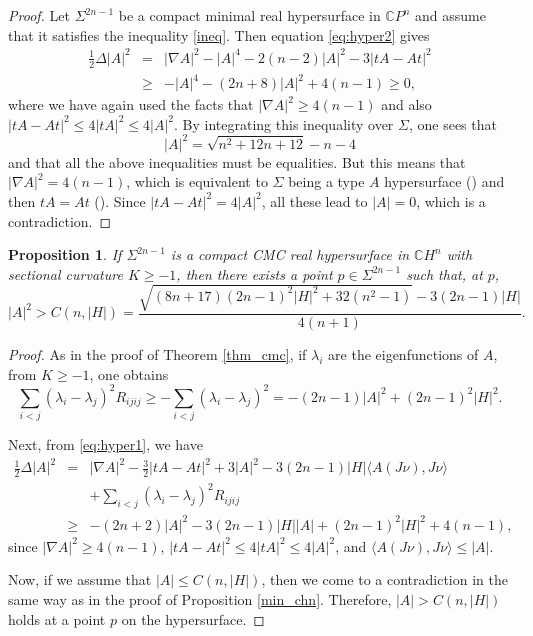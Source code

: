 \documentclass[11pt]{amsart}
\theoremstyle{plain}
\newtheorem{proposition}  [theorem]  {Proposition}
\theoremstyle{definition}
\numberwithin{equation}{section}
\begin{document}
\begin{proof} Let $\Sigma^{2n-1}$ be a compact minimal real hypersurface in $\mathbb{C}P^n$ and assume that it satisfies the inequality \eqref{ineq}. Then equation \eqref{eq:hyper2} gives
\begin{eqnarray*}
\frac{1}{2}\Delta |A|^2&=&|\nabla A|^2-|A|^4-2(n-2)|A|^2-3|tA-At|^2\\&\geq&-|A|^4-(2n+8)|A|^2+4(n-1)\geq 0,
\end{eqnarray*}
where we have again used the facts that $|\nabla A|^2\geq 4(n-1)$ and also $|tA-At|^2\leq 4|tA|^2\leq 4|A|^2$. By integrating this inequality over $\Sigma$, one sees that
$$
|A|^2=\sqrt{n^2+12n+12}-n-4
$$
and that all the above inequalities must be equalities. But this means that $|\nabla A|^2=4(n-1)$, which is equivalent to $\Sigma$ being a type $A$ hypersurface (\cite[Corollary 4.4]{NR}) and then $tA=At$ (\cite[Theorem 4.1]{NR}). Since $|tA-At|^2=4|A|^2$, all these lead to $|A|=0$, which is a contradiction.
\end{proof}

\begin{proposition} If $\Sigma^{2n-1}$ is a compact CMC real hypersurface in $\mathbb{C}H^n$ with sectional curvature $K\geq -1$, then there exists a point $p\in\Sigma^{2n-1}$ such that, at $p$,
$$
|A|^2>C(n,|H|)=\frac{\sqrt{(8n+17)(2n-1)^2|H|^2+32(n^2-1)}-3(2n-1)|H|}{4(n+1)}.
$$
\end{proposition}

\begin{proof} As in the proof of Theorem \ref{thm_cmc}, if $\lambda_i$ are the eigenfunctions of $A$, from $K\geq -1$, one obtains
$$
\sum_{i<j}(\lambda_i-\lambda_j)^2R_{ijij}\geq-\sum_{i<j}(\lambda_i-\lambda_j)^2=-(2n-1)|A|^2+(2n-1)^2|H|^2.
$$

Next, from \eqref{eq:hyper1}, we have
\begin{eqnarray*}
\frac{1}{2}\Delta|A|^2&=&|\nabla A|^2-\frac{3}{2}|tA-At|^2+3|A|^2-3(2n-1)|H|\langle A(J\nu),J\nu\rangle\\&&+\sum_{i<j}(\lambda_i-\lambda_j)^2R_{ijij}\\&\geq&-(2n+2)|A|^2-3(2n-1)|H||A|+(2n-1)^2|H|^2+4(n-1),
\end{eqnarray*}
since $|\nabla A|^2\geq 4(n-1)$, $|tA-At|^2\leq 4|tA|^2\leq 4|A|^2$, and $\langle A(J\nu),J\nu\rangle\leq |A|$. 

Now, if we assume that $|A|\leq C(n,|H|)$, then we come to a contradiction in the same way as in the proof of Proposition \ref{min_chn}. Therefore, $|A|>C(n,|H|)$ holds at a point $p$ on the hypersurface.
\end{proof}
\end{document}
